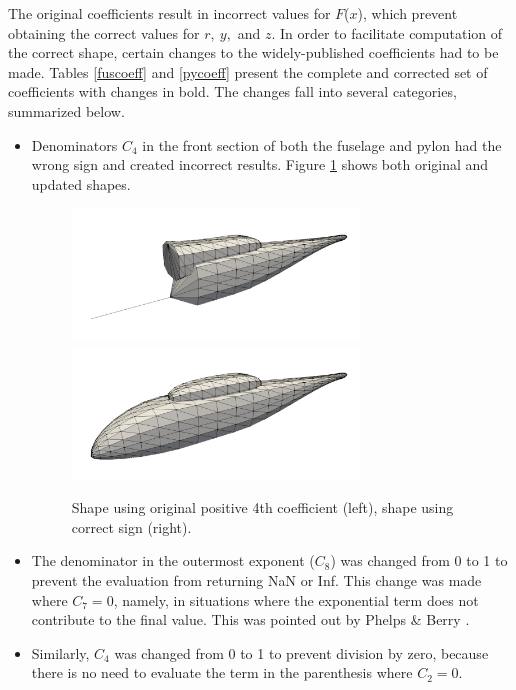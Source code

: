 \documentclass[journal]{new-aiaa}
\begin{document}
The original coefficients result in incorrect values for $F$($x$), which prevent obtaining the correct values for $r, \ y,$ and $z$. In order to facilitate computation of the correct shape, certain changes to the
widely-published coefficients had to be made.
Tables \ref{fuscoeff} and \ref{pycoeff} present the complete and corrected set of coefficients with changes in bold.
The changes fall into several categories, summarized below.
\begin{itemize}
\item Denominators $C_{4}$ in the front section of both the fuselage and pylon had the wrong sign
and created incorrect results.
Figure \ref{badc4} shows both original and updated shapes.
\begin{figure} \begin{centering}
\includegraphics[width=3.0in]{img_badc4.png}
\includegraphics[width=3.0in]{img_good.png}
\caption{Shape using original positive 4th coefficient (left), shape using correct sign (right).}
\label{badc4}
\end{centering}\end{figure}%
\item The denominator in the outermost exponent ($C_{8}$) was changed from 0 to 1 to prevent the evaluation from returning NaN or Inf.
This change was made where $C_{7}=0$, namely, in situations where the exponential term does not contribute to the final value.
This was pointed out by Phelps \& Berry \cite{nasa87762}.
\item Similarly, $C_{4}$ was changed from 0 to 1 to prevent division by zero, because
there is no need to evaluate the term in the parenthesis where $C_{2}=0$.

\end{itemize}
\end{document}
